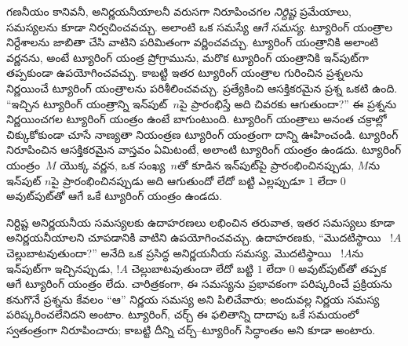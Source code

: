 \documentclass[../../../include/open-logic-section]{subfiles}
\begin{document}
గణనీయం కానివనీ, అనిర్ణయనీయాలనీ వరుసగా నిరూపించగల \emph{నిర్దిష్ట}
ప్రమేయాలు, సమస్యలను కూడా నిర్వచించవచ్చు. అలాంటి ఒక సమస్యే \emph{ఆగే సమస్య}.
ట్యూరింగ్ యంత్రాల నిర్దేశాలను జాబితా చేసి వాటిని పరిమితంగా వర్ణించవచ్చు.
ట్యూరింగ్ యంత్రానికి అలాంటి వర్ణనను, అంటే ట్యూరింగ్ యంత్ర ప్రోగ్రామును, మరొక
ట్యూరింగ్ యంత్రానికి ఇన్‌పుట్‌గా తప్పకుండా ఉపయోగించవచ్చు. కాబట్టి ఇతర ట్యూరింగ్
యంత్రాల గురించిన ప్రశ్నలను నిర్ణయించే ట్యూరింగ్ యంత్రాలను పరిశీలించవచ్చు.
ప్రత్యేకించి ఆసక్తికరమైన ప్రశ్న ఒకటి ఉంది. ``ఇచ్చిన ట్యూరింగ్ యంత్రాన్ని ఇన్‌పుట్~$n$పై
ప్రారంభిస్తే అది చివరకు ఆగుతుందా?'' ఈ ప్రశ్నను నిర్ణయించగల ట్యూరింగ్ యంత్రం
ఉంటే బాగుంటుంది. ట్యూరింగ్ యంత్రాలు అనంత చక్రాల్లో చిక్కుకోకుండా చూసే నాణ్యతా
నియంత్రణ ట్యూరింగ్ యంత్రంగా దాన్ని ఊహించండి. ట్యూరింగ్ నిరూపించిన ఆసక్తికరమైన
వాస్తవం ఏమిటంటే, అలాంటి ట్యూరింగ్ యంత్రం ఉండదు. ట్యూరింగ్ యంత్రం~$M$ యొక్క
వర్ణన, ఒక సంఖ్య~$n$తో కూడిన ఇన్‌పుట్‌పై ప్రారంభించినప్పుడు, $M$ను ఇన్‌పుట్
$n$పై ప్రారంభించినప్పుడు అది ఆగుతుందో లేదో బట్టి ఎల్లప్పుడూ $1$ లేదా $0$
అవుట్‌పుట్‌తో ఆగే ఒకే ట్యూరింగ్ యంత్రం ఉండదు.

నిర్దిష్ట అనిర్ణయనీయ సమస్యలకు ఉదాహరణలు లభించిన తరువాత, ఇతర సమస్యలు కూడా
అనిర్ణయనీయాలని చూపడానికి వాటిని ఉపయోగించవచ్చు. ఉదాహరణకు, ``మొదటిస్థాయి
~$!A$ చెల్లుబాటవుతుందా?'' అనేది ఒక ప్రసిద్ధ అనిర్ణయనీయ సమస్య.
మొదటిస్థాయి ~$!A$ను ఇన్‌పుట్‌గా ఇచ్చినప్పుడు, $!A$ చెల్లుబాటవుతుందా
లేదో బట్టి $1$ లేదా $0$ అవుట్‌పుట్‌తో తప్పక ఆగే ట్యూరింగ్ యంత్రం లేదు.
చారిత్రకంగా, ఈ సమస్యను ప్రభావకంగా పరిష్కరించే ప్రక్రియను కనుగొనే ప్రశ్నను
కేవలం ``ఆ'' నిర్ణయ సమస్య అని పిలిచేవారు; అందువల్ల నిర్ణయ సమస్య పరిష్కరించలేనిదని
అంటాం. ట్యూరింగ్, చర్చ్ ఈ ఫలితాన్ని దాదాపు ఒకే సమయంలో స్వతంత్రంగా నిరూపించారు;
కాబట్టి దీన్ని చర్చ్--ట్యూరింగ్ సిద్ధాంతం అని కూడా అంటారు.
\end{document}
